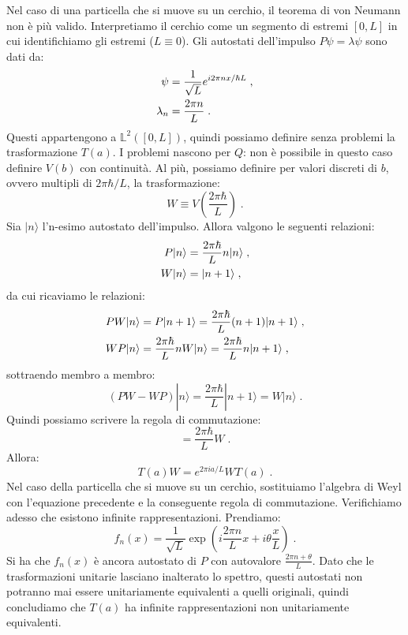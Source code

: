 \documentclass[10pt,a4paper]{report}
\theoremstyle{definition}
\numberwithin{equation}{section}
\newcommand{\ket}{\rangle}
\begin{document}
Nel caso di una particella che si muove su un cerchio, il teorema di von Neumann non è più valido. Interpretiamo il cerchio come un segmento di estremi $[0,L]$ in cui identifichiamo gli estremi ($L\equiv 0$). Gli autostati dell'impulso $P\psi=\lambda\psi$ sono dati da:
\begin{align}
\psi &= \frac{1}{\sqrt{L}}e^{i2\pi nx/\hbar L}\;, \notag \\
\lambda_n &= \frac{2\pi n}{L}\;.
\end{align}
Questi appartengono a $\mathbb{L}^2([0,L])$, quindi possiamo definire senza problemi la trasformazione $T(a)$. I problemi nascono per $Q$: non è possibile in questo caso definire $V(b)$ con continuità. Al più, possiamo definire per valori discreti di $b$, ovvero multipli di $2\pi\hbar/L$, la trasformazione:
\begin{equation}
W\equiv V\left(\frac{2\pi\hbar}{L}\right)\;.
\end{equation}
Sia $|n\ket$ l'n-esimo autostato dell'impulso. Allora valgono le seguenti relazioni:
\begin{align}
P|n\ket&=\frac{2\pi\hbar}{L}n|n\ket \notag\;, \\
W|n\ket &= |n+1\ket\;,
\end{align}
da cui ricaviamo le relazioni:
\begin{align}
PW|n\ket&=P|n+1\ket=\frac{2\pi\hbar}{L}(n+1)|n+1\ket \notag\;, \\
WP|n\ket&=\frac{2\pi\hbar}{L}nW|n\ket=\frac{2\pi\hbar}{L}n|n+1\ket\;,
\end{align}
sottraendo membro a membro:
\begin{equation}
(PW-WP)|n\ket=\frac{2\pi\hbar}{L}|n+1\ket=W|n\ket\;.
\end{equation}
Quindi possiamo scrivere la regola di commutazione:
\begin{equation}
[P,W]=\frac{2\pi\hbar}{L}W\;.
\end{equation}
Allora:
\begin{equation}
T(a)W=e^{2\pi ia/L}WT(a)\;.
\end{equation}
Nel caso della particella che si muove su un cerchio, sostituiamo l'algebra di Weyl con l'equazione precedente e la conseguente regola di commutazione. Verifichiamo adesso che esistono infinite rappresentazioni. Prendiamo:
\begin{equation}
f_n(x)=\frac{1}{\sqrt{L}}\exp\left(i\frac{2\pi n}{L}x+i\theta\frac{x}{L}\right)\;.
\end{equation}
Si ha che $f_n(x)$ è ancora autostato di $P$ con autovalore $\frac{2\pi n+\theta}{L}$. Dato che le trasformazioni unitarie lasciano inalterato lo spettro, questi autostati non potranno mai essere unitariamente equivalenti a quelli originali, quindi concludiamo che $T(a)$ ha infinite rappresentazioni non unitariamente equivalenti.
\end{document}
